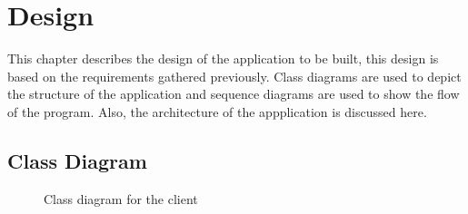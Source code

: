 \chapter{Design}
This chapter describes the design of the application to be built, this design is based on the requirements gathered previously.
Class diagrams are used to depict the structure of the application and sequence diagrams are used to show the flow of the program. 
Also, the architecture of the appplication is discussed here.

\section{Class Diagram}

\begin{center}
\begin{figure}[h!]
\caption{Class diagram for the client}
\end{figure}
\end{center}

